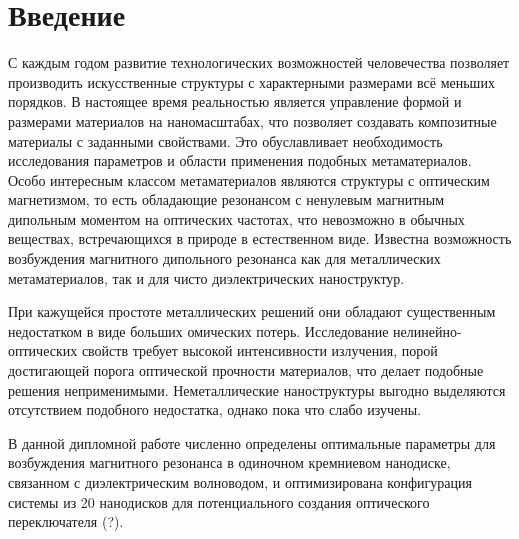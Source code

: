 \chapter{Введение}

С каждым годом развитие технологических возможностей человечества позволяет производить искусственные структуры с характерными размерами всё меньших порядков. В настоящее время реальностью является управление формой и размерами материалов на наномасштабах, что позволяет создавать композитные материалы с заданными свойствами. Это обуславливает необходимость исследования параметров и области применения подобных метаматериалов. Особо интересным классом метаматериалов являются структуры с оптическим магнетизмом, то есть обладающие резонансом с ненулевым магнитным дипольным моментом на оптических частотах, что невозможно в обычных веществах, встречающихся в природе в естественном виде. Известна возможность возбуждения магнитного дипольного резонанса как для металлических метаматериалов, так и для чисто диэлектрических наноструктур.

При кажущейся простоте металлических решений они обладают существенным недостатком в виде больших омических потерь. Исследование нелинейно-оптических свойств требует высокой интенсивности излучения, порой достигающей порога оптической прочности материалов, что делает подобные решения неприменимыми. Неметаллические наноструктуры выгодно выделяются отсутствием подобного недостатка, однако пока что слабо изучены.

В данной дипломной работе численно определены оптимальные параметры для возбуждения магнитного резонанса в одиночном кремниевом нанодиске, связанном с диэлектрическим волноводом, и оптимизирована конфигурация системы из 20 нанодисков для потенциального создания оптического переключателя (?).